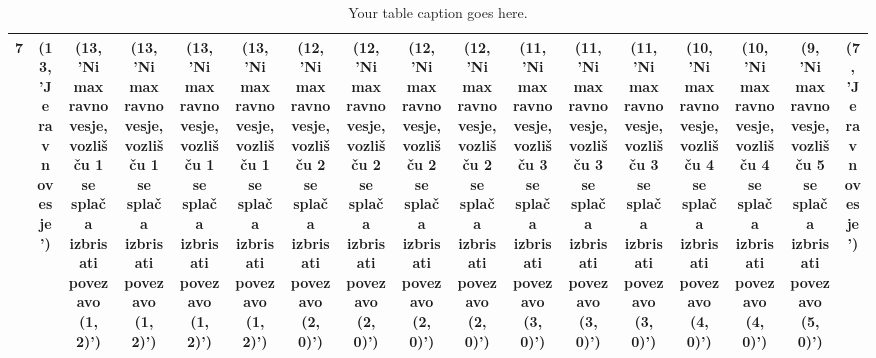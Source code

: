 \documentclass[fin1, tisk]{fmfdelo}
\begin{document}
\begin{table}[h]
{\begin{tabular}{|c|*{16}{c|}}
            7 & (13, 'Je ravnovesje') & (13, 'Ni max ravnovesje, vozlišču 1 se splača izbrisati povezavo (1, 2)') & (13, 'Ni max ravnovesje, vozlišču 1 se splača izbrisati povezavo (1, 2)') & (13, 'Ni max ravnovesje, vozlišču 1 se splača izbrisati povezavo (1, 2)') & (13, 'Ni max ravnovesje, vozlišču 1 se splača izbrisati povezavo (1, 2)') & (12, 'Ni max ravnovesje, vozlišču 2 se splača izbrisati povezavo (2, 0)') & (12, 'Ni max ravnovesje, vozlišču 2 se splača izbrisati povezavo (2, 0)') & (12, 'Ni max ravnovesje, vozlišču 2 se splača izbrisati povezavo (2, 0)') & (12, 'Ni max ravnovesje, vozlišču 2 se splača izbrisati povezavo (2, 0)') & (11, 'Ni max ravnovesje, vozlišču 3 se splača izbrisati povezavo (3, 0)') & (11, 'Ni max ravnovesje, vozlišču 3 se splača izbrisati povezavo (3, 0)') & (11, 'Ni max ravnovesje, vozlišču 3 se splača izbrisati povezavo (3, 0)') & (10, 'Ni max ravnovesje, vozlišču 4 se splača izbrisati povezavo (4, 0)') & (10, 'Ni max ravnovesje, vozlišču 4 se splača izbrisati povezavo (4, 0)') & (9, 'Ni max ravnovesje, vozlišču 5 se splača izbrisati povezavo (5, 0)') & (7, 'Je ravnovesje') \\
        \hline
        \end{tabular}
    }
    \caption{Your table caption goes here.}
    \label{tab:tabela1}
\end{table}

\\
\end{document}
